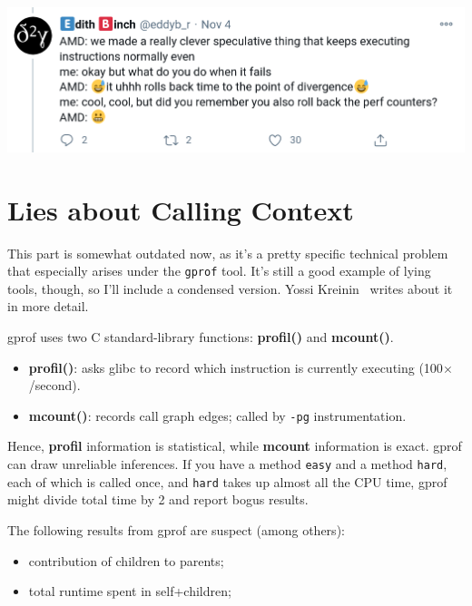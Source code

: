 \begin{center}
\includegraphics{images/L27-eb-tweet.png}
\end{center}

\section*{Lies about Calling Context}
This part is somewhat outdated now, as it's a pretty specific technical problem that especially arises under the {\tt gprof} tool. It's still a good example of lying tools, though,
so I'll include a condensed version. Yossi Kreinin~\cite{lies} writes about it in more detail.

gprof uses two C standard-library functions: {\bf profil()} and {\bf mcount()}.

\vspace*{-1em}
\begin{itemize}[noitemsep]
\item {\bf profil()}: asks glibc to record which instruction 
  is currently executing (100$\times$/second).
\item {\bf mcount()}: records call graph edges; called by {\tt -pg} instrumentation.
\end{itemize}
\vspace*{-1em}

Hence, {\bf profil} information is statistical, while {\bf mcount}
information is exact.  gprof can draw unreliable inferences. If you have a method \texttt{easy} and a method \texttt{hard}, each of which is called once, and \texttt{hard} takes up almost all the CPU time,
gprof might divide total time by 2 and report bogus results.

The following results from gprof are suspect (among others):
\vspace*{-1em}
\begin{itemize}[noitemsep]
  \item contribution of children to parents;
  \item total runtime spent in self+children;
\end{itemize}
\vspace*{-1em}

